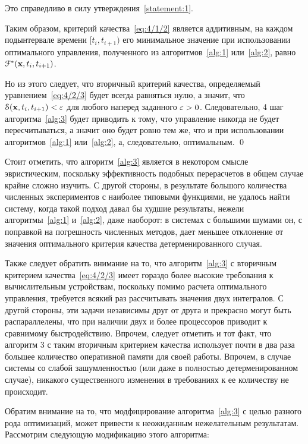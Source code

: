 Это справедливо в силу утверждения~\vref{statement:1}.

Таким образом, критерий качества~\ref{eq:4/1/2} является аддитивным, на каждом подынтервале времени $[t_i, t_{i+1})$ его минимальное значение при использовании оптимального управления, полученного из алгоритмов~\ref{alg:1} или~\ref{alg:2}, равно $\mathcal{F}^{*}(\mathbf{x}, t_i, t_{i+1})$.

Но из этого следует, что вторичный критерий качества, определяемый уравнением~\ref{eq:4/2/3} будет всегда равняться нулю, а значит, что $\mathcal{S}(\mathbf{x}, t_i, t_{i+1}) < \varepsilon$ для любого наперед заданного $\varepsilon > 0$. Следовательно, 4 шаг алгоритма~\ref{alg:3} будет приводить к тому, что управление никогда не будет пересчитываться, а значит оно будет ровно тем же, что и при использовании алгоритмов~\ref{alg:1} или~\ref{alg:2}, а, следовательно, оптимальным. \qed

Стоит отметить, что алгоритм~\ref{alg:3} является в некотором смысле эвристическим, поскольку эффективность подобных перерасчетов в общем случае крайне сложно изучить. С другой стороны, в результате большого количества численных экспериментов с наиболее типовыми функциями, не удалось найти систему, когда такой подход давал бы худшие результаты, нежели алгоритмы~\ref{alg:1} и~\ref{alg:2}, даже наоборот: в системах с большими шумами он, с поправкой на погрешность численных методов, дает меньшее отклонение от значения оптимального критерия качества детерменированного случая.

Также следует обратить внимание на то, что алгоритм~\ref{alg:3} с вторичным критерием качества~\ref{eq:4/2/3} имеет гораздо более высокие требования к вычислительным устройствам, поскольку помимо расчета оптимального управления, требуется всякий раз рассчитывать значения двух интегралов. С другой стороны, эти задачи независимы друг от друга и прекрасно могут быть распараллелены, что при наличии двух и более процессоров приводит к сравнимому быстродействию. Впрочем, следует отметить и тот факт, что алгоритм 3 с таким вторичным критерием качества использует почти в два раза большее количество оперативной памяти для своей работы. Впрочем, в случае системы со слабой зашумленностью (или даже в полностью детерменированном случае), никакого существенного изменения в требованиях к ее количеству не происходит.

\br

Обратим внимание на то, что модфицирование алгоритма~\vref{alg:3} с целью разного рода оптимизаций, может привести к неожиданным нежелательным результатам. Рассмотрим следующую модификацию этого алгоритма:

